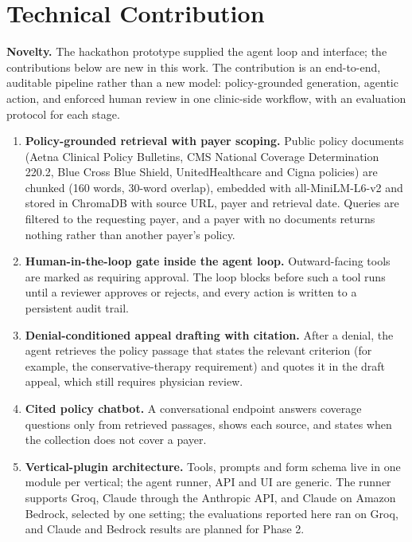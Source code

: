 \documentclass[final]{cvpr}
\begin{document}
\section{Technical Contribution}
\textbf{Novelty.} The hackathon prototype supplied the agent loop and interface; the contributions below are new in this work. The contribution is an end-to-end, auditable pipeline rather than a new model: policy-grounded generation, agentic action, and enforced human review in one clinic-side workflow, with an evaluation protocol for each stage.
\begin{enumerate}
\item \textbf{Policy-grounded retrieval with payer scoping.} Public policy documents (Aetna Clinical Policy Bulletins, CMS National Coverage Determination 220.2, Blue Cross Blue Shield, UnitedHealthcare and Cigna policies) are chunked (160 words, 30-word overlap), embedded with all-MiniLM-L6-v2 \cite{reimers2019sbert} and stored in ChromaDB with source URL, payer and retrieval date. Queries are filtered to the requesting payer, and a payer with no documents returns nothing rather than another payer's policy.
\item \textbf{Human-in-the-loop gate inside the agent loop.} Outward-facing tools are marked as requiring approval. The loop blocks before such a tool runs until a reviewer approves or rejects, and every action is written to a persistent audit trail.
\item \textbf{Denial-conditioned appeal drafting with citation.} After a denial, the agent retrieves the policy passage that states the relevant criterion (for example, the conservative-therapy requirement) and quotes it in the draft appeal, which still requires physician review.
\item \textbf{Cited policy chatbot.} A conversational endpoint answers coverage questions only from retrieved passages, shows each source, and states when the collection does not cover a payer.
\item \textbf{Vertical-plugin architecture.} Tools, prompts and form schema live in one module per vertical; the agent runner, API and UI are generic. The runner supports Groq, Claude through the Anthropic API, and Claude on Amazon Bedrock, selected by one setting; the evaluations reported here ran on Groq, and Claude and Bedrock results are planned for Phase 2.
\end{enumerate}
\end{document}
